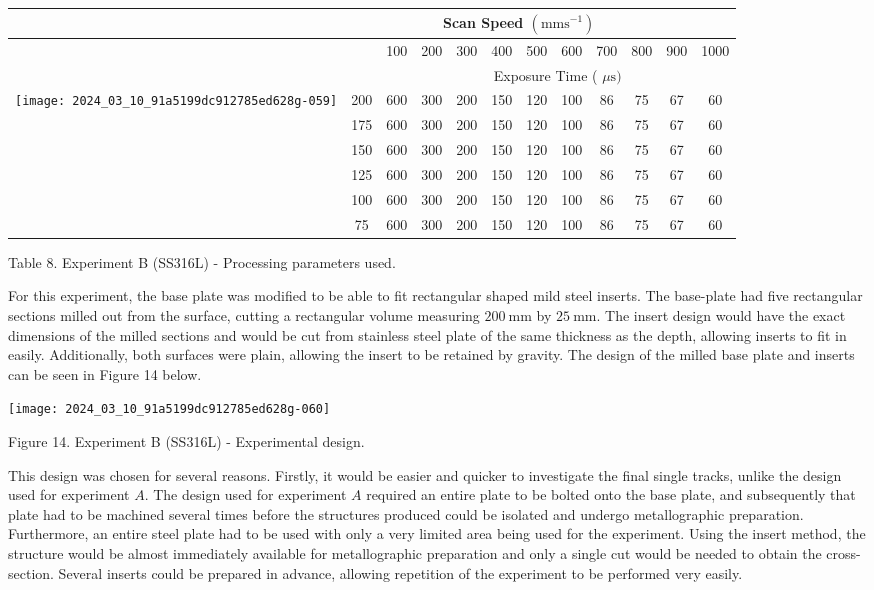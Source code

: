 \documentclass[10pt]{article}
\begin{document}
\begin{center}
\begin{tabular}{|c|c|c|c|c|c|c|c|c|c|c|c|}
\hline
 & \multicolumn{10}{|c|}{Scan Speed $\left(\mathrm{mms}^{-1}\right)$} &  \\
\hline
 &  & 100 & 200 & 300 & 400 & 500 & 600 & 700 & 800 & 900 & 1000 \\
\hline
 &  & \multicolumn{10}{|c|}{Exposure Time ( $\mu \mathrm{s})$} \\
\hline
\multirow{6}{*}{\texttt{[image: 2024\_03\_10\_91a5199dc912785ed628g-059]}
} & 200 & 600 & 300 & 200 & 150 & 120 & 100 & 86 & 75 & 67 & 60 \\
\hline
 & 175 & 600 & 300 & 200 & 150 & 120 & 100 & 86 & 75 & 67 & 60 \\
\hline
 & 150 & 600 & 300 & 200 & 150 & 120 & 100 & 86 & 75 & 67 & 60 \\
\hline
 & 125 & 600 & 300 & 200 & 150 & 120 & 100 & 86 & 75 & 67 & 60 \\
\hline
 & 100 & 600 & 300 & 200 & 150 & 120 & 100 & 86 & 75 & 67 & 60 \\
\hline
 & 75 & 600 & 300 & 200 & 150 & 120 & 100 & 86 & 75 & 67 & 60 \\
\hline
\end{tabular}
\end{center}

Table 8. Experiment B (SS316L) - Processing parameters used.

For this experiment, the base plate was modified to be able to fit rectangular shaped mild steel inserts. The base-plate had five rectangular sections milled out from the surface, cutting a rectangular volume measuring $200 \mathrm{~mm}$ by $25 \mathrm{~mm}$. The insert design would have the exact dimensions of the milled sections and would be cut from stainless steel plate of the same thickness as the depth, allowing inserts to fit in easily. Additionally, both surfaces were plain, allowing the insert to be retained by gravity. The design of the milled base plate and inserts can be seen in Figure 14 below.

\begin{center}
\texttt{[image: 2024\_03\_10\_91a5199dc912785ed628g-060]}
\end{center}

Figure 14. Experiment B (SS316L) - Experimental design.

This design was chosen for several reasons. Firstly, it would be easier and quicker to investigate the final single tracks, unlike the design used for experiment $A$. The design used for experiment $A$ required an entire plate to be bolted onto the base plate, and subsequently that plate had to be machined several times before the structures produced could be isolated and undergo metallographic preparation. Furthermore, an entire steel plate had to be used with only a very limited area being used for the experiment. Using the insert method, the structure would be almost immediately available for metallographic preparation and only a single cut would be needed to obtain the cross-section. Several inserts could be prepared in advance, allowing repetition of the experiment to be performed very easily.
\end{document}
